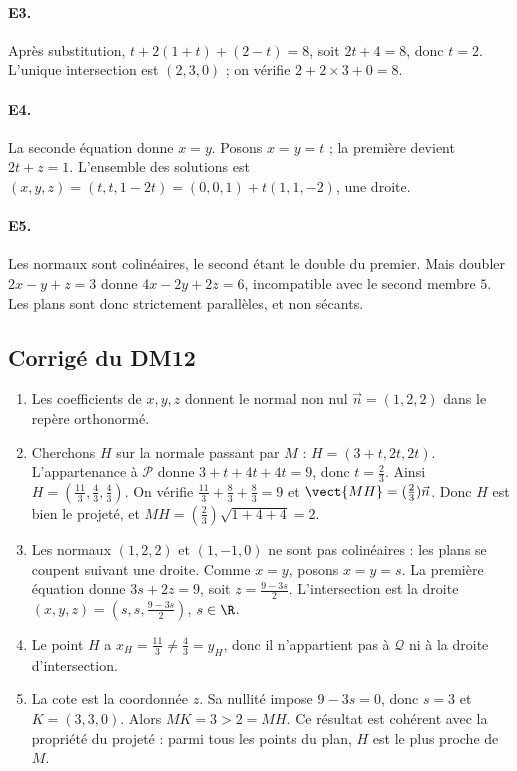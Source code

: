 \paragraph{E3.}Après substitution, $t+2(1+t)+(2-t)=8$, soit $2t+4=8$, donc $t=2$. L'unique intersection est $(2,3,0)$ ; on vérifie $2+2\times3+0=8$.

\paragraph{E4.}La seconde équation donne $x=y$. Posons $x=y=t$ ; la première devient $2t+z=1$. L'ensemble des solutions est $(x,y,z)=(t,t,1-2t)=(0,0,1)+t(1,1,-2)$, une droite.

\paragraph{E5.}Les normaux sont colinéaires, le second étant le double du premier. Mais doubler $2x-y+z=3$ donne $4x-2y+2z=6$, incompatible avec le second membre $5$. Les plans sont donc strictement parallèles, et non sécants.


\subsection{Corrigé du DM12}\begin{enumerate}
\item Les coefficients de $x,y,z$ donnent le normal non nul $\vec n=(1,2,2)$ dans le repère orthonormé.
\item Cherchons $H$ sur la normale passant par $M$ : $H=(3+t,2t,2t)$. L'appartenance à $\mathcal P$ donne $3+t+4t+4t=9$, donc $t=\frac{2}{3}$. Ainsi $H=(\frac{11}{3},\frac{4}{3},\frac{4}{3})$. On vérifie $\frac{11}{3}+\frac{8}{3}+\frac{8}{3}=9$ et $\vect{MH}=(\frac{2}{3})\vec{n}$. Donc $H$ est bien le projeté, et $MH=(\frac{2}{3})\sqrt{1+4+4}=2$.
\item Les normaux $(1,2,2)$ et $(1,-1,0)$ ne sont pas colinéaires : les plans se coupent suivant une droite. Comme $x=y$, posons $x=y=s$. La première équation donne $3s+2z=9$, soit $z=\frac{9-3s}{2}$. L'intersection est la droite $(x,y,z)=(s,s,\frac{9-3s}{2})$, $s\in\R$.
\item Le point $H$ a $x_H=\frac{11}{3}\ne\frac{4}{3}=y_H$, donc il n'appartient pas à $\mathcal Q$ ni à la droite d'intersection.
\item La cote est la coordonnée $z$. Sa nullité impose $9-3s=0$, donc $s=3$ et $K=(3,3,0)$. Alors $MK=3>2=MH$. Ce résultat est cohérent avec la propriété du projeté : parmi tous les points du plan, $H$ est le plus proche de $M$.
\end{enumerate}

